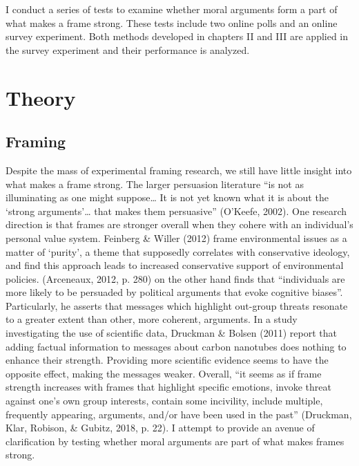 \documentclass[12pt,econ]{sources/authesis}
\begin{document}
I conduct a series of tests to examine whether moral arguments form a part of what makes a frame strong. These tests include two online polls and an online survey experiment. Both methods developed in chapters II and III are applied in the survey experiment and their performance is analyzed.

\hypertarget{framing-theory}{%
\section{Theory}\label{framing-theory}}

\hypertarget{framing-theory-framing}{%
\subsection{Framing}\label{framing-theory-framing}}

Despite the mass of experimental framing research, we still have little insight into what makes a frame strong. The larger persuasion literature ``is not as illuminating as one might suppose\ldots{} It is not yet known what it is about the `strong arguments'\ldots{} that makes them persuasive'' (O'Keefe, 2002). One research direction is that frames are stronger overall when they cohere with an individual's personal value system. Feinberg \& Willer (2012) frame environmental issues as a matter of `purity', a theme that supposedly correlates with conservative ideology, and find this approach leads to increased conservative support of environmental policies. (Arceneaux, 2012, p. 280) on the other hand finds that ``individuals are more likely to be persuaded by political arguments that evoke cognitive biases''. Particularly, he asserts that messages which highlight out-group threats resonate to a greater extent than other, more coherent, arguments. In a study investigating the use of scientific data, Druckman \& Bolsen (2011) report that adding factual information to messages about carbon nanotubes does nothing to enhance their strength. Providing more scientific evidence seems to have the opposite effect, making the messages weaker. Overall, ``it seems as if frame strength increases with frames that highlight specific emotions, invoke threat against one's own group interests, contain some incivility, include multiple, frequently appearing, arguments, and/or have been used in the past'' (Druckman, Klar, Robison, \& Gubitz, 2018, p. 22). I attempt to provide an avenue of clarification by testing whether moral arguments are part of what makes frames strong.
\end{document}
